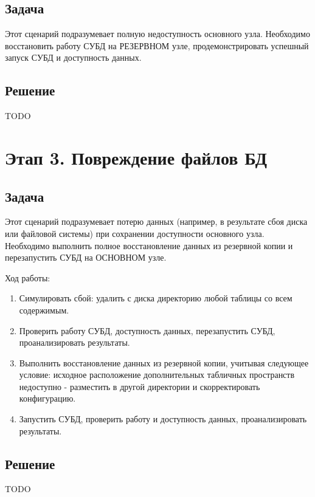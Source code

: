 \documentclass{article}
\begin{document}
\subsection{Задача}

Этот сценарий подразумевает полную недоступность основного узла. Необходимо восстановить работу СУБД на РЕЗЕРВНОМ узле, продемонстрировать успешный запуск СУБД и доступность данных.

\subsection{Решение}

TODO

\section{Этап 3. Повреждение файлов БД}

\subsection{Задача}

Этот сценарий подразумевает потерю данных (например, в результате сбоя диска или файловой системы) при сохранении доступности основного узла. Необходимо выполнить полное восстановление данных из резервной копии и перезапустить СУБД на ОСНОВНОМ узле.


Ход работы:

\begin{enumerate}
    \item Симулировать сбой: удалить с диска директорию любой таблицы со всем содержимым.
    \item Проверить работу СУБД, доступность данных, перезапустить СУБД, проанализировать результаты.
    \item Выполнить восстановление данных из резервной копии, учитывая следующее условие: исходное расположение дополнительных табличных пространств недоступно - разместить в другой директории и скорректировать конфигурацию.
    \item Запустить СУБД, проверить работу и доступность данных, проанализировать результаты.
\end{enumerate}

\subsection{Решение}

TODO
\end{document}

